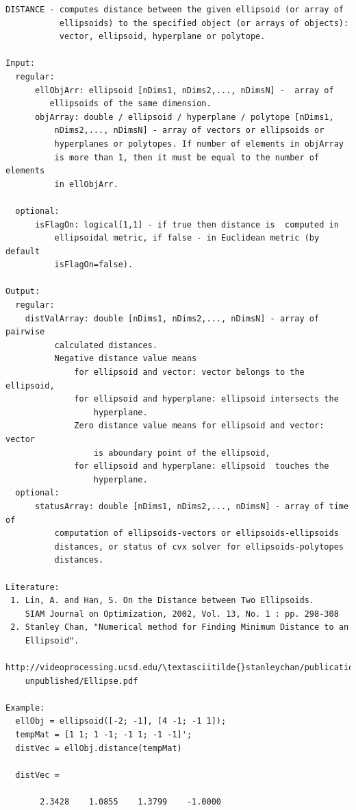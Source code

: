 \documentclass[letterpaper,10pt,english]{sphinxmanual}
\begin{document}
\begin{Verbatim}[commandchars=\\\{\}]
DISTANCE - computes distance between the given ellipsoid (or array of
           ellipsoids) to the specified object (or arrays of objects):
           vector, ellipsoid, hyperplane or polytope.

Input:
  regular:
      ellObjArr: ellipsoid [nDims1, nDims2,..., nDimsN] -  array of
         ellipsoids of the same dimension.
      objArray: double / ellipsoid / hyperplane / polytope [nDims1,
          nDims2,..., nDimsN] - array of vectors or ellipsoids or
          hyperplanes or polytopes. If number of elements in objArray
          is more than 1, then it must be equal to the number of elements
          in ellObjArr.

  optional:
      isFlagOn: logical[1,1] - if true then distance is  computed in
          ellipsoidal metric, if false - in Euclidean metric (by default
          isFlagOn=false).

Output:
  regular:
    distValArray: double [nDims1, nDims2,..., nDimsN] - array of pairwise
          calculated distances.
          Negative distance value means
              for ellipsoid and vector: vector belongs to the ellipsoid,
              for ellipsoid and hyperplane: ellipsoid intersects the
                  hyperplane.
              Zero distance value means for ellipsoid and vector: vector
                  is aboundary point of the ellipsoid,
              for ellipsoid and hyperplane: ellipsoid  touches the
                  hyperplane.
  optional:
      statusArray: double [nDims1, nDims2,..., nDimsN] - array of time of
          computation of ellipsoids-vectors or ellipsoids-ellipsoids
          distances, or status of cvx solver for ellipsoids-polytopes
          distances.

Literature:
 1. Lin, A. and Han, S. On the Distance between Two Ellipsoids.
    SIAM Journal on Optimization, 2002, Vol. 13, No. 1 : pp. 298-308
 2. Stanley Chan, "Numerical method for Finding Minimum Distance to an
    Ellipsoid".
    http://videoprocessing.ucsd.edu/\textasciitilde{}stanleychan/publication/...
    unpublished/Ellipse.pdf

Example:
  ellObj = ellipsoid([-2; -1], [4 -1; -1 1]);
  tempMat = [1 1; 1 -1; -1 1; -1 -1]';
  distVec = ellObj.distance(tempMat)

  distVec =

       2.3428    1.0855    1.3799    -1.0000
\end{Verbatim}
\end{document}
